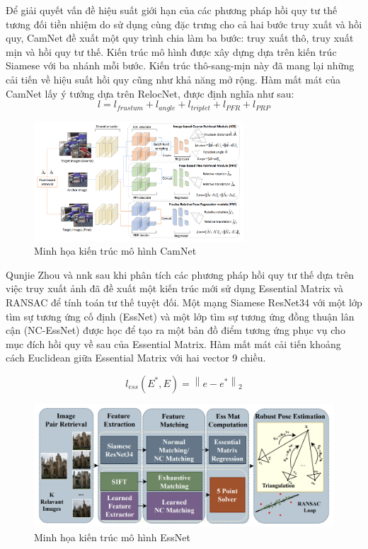 Để giải quyết vấn đề hiệu suất giới hạn của các phương pháp hồi quy tư thế tương đối tiền nhiệm do sử dụng cùng đặc trưng cho cả hai bước truy xuất và hồi quy, CamNet \cite{9008579} đề xuất một quy trình chia làm ba bước: truy xuất thô, truy xuất mịn và hồi quy tư thế. Kiến trúc mô hình được xây dựng dựa trên kiến trúc Siamese với ba nhánh mỗi bước. Kiến trúc thô-sang-mịn này đã mang lại những cải tiến về hiệu suất hồi quy cũng như khả năng mở rộng. Hàm mất mát của CamNet lấy ý tưởng dựa trên RelocNet, được định nghĩa như sau:
\begin{equation}
    l = l_{frustum} + l_{angle} + l_{triplet} + l_{PFR} + l_{PRP}
\end{equation}
\begin{figure}[H]
    \centering
    \includegraphics[width=0.7\textwidth]{pics/Chapter2/camnet.png}
    \caption{Minh họa kiến trúc mô hình CamNet \cite{9008579}}
\end{figure}

Qunjie Zhou và nnk \cite{zhou2020learn} sau khi phân tích các phương pháp hồi quy tư thế dựa trên việc truy xuất ảnh đã đề xuất một kiến trúc mới sử dụng Essential Matrix và RANSAC để tính toán tư thế tuyệt đối. Một mạng Siamese ResNet34 với một lớp tìm sự tương ứng cố định (EssNet) và một lớp tìm sự tương ứng đồng thuận lân cận (NC-EssNet) được học để tạo ra một bản đồ điểm tương ứng phục vụ cho mục đích hồi quy về sau của Essential Matrix. Hàm mất mát cải tiến khoảng cách Euclidean giữa Essential Matrix với hai vector 9 chiều.

\begin{equation}
    l_{ess}(E^*, E) = \left \| e - e^* \right \|_2
\end{equation}
\begin{figure}[H]
    \centering
    \includegraphics[width=\textwidth]{pics/Chapter2/essnet.png}
    \caption{Minh họa kiến trúc mô hình EssNet \cite{zhou2020learn}}
\end{figure}

